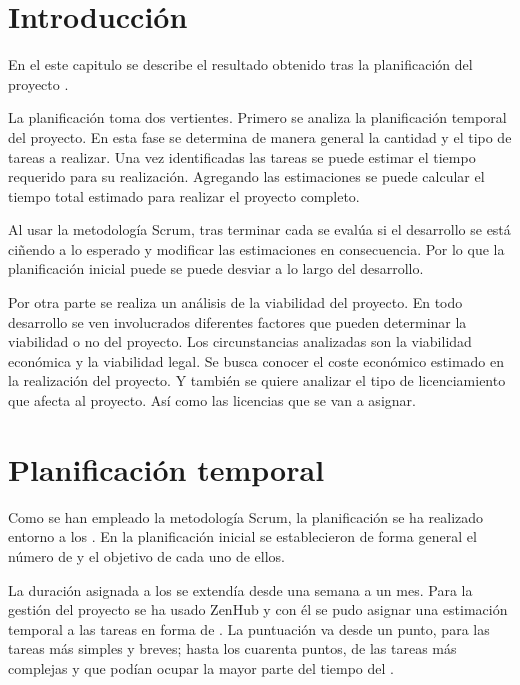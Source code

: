 \label{ch:plan}

\section{Introducción} \label{sec:plan-intro}
En el este capitulo se describe el resultado obtenido tras la planificación del
proyecto .

La planificación toma dos vertientes. Primero se analiza la planificación 
temporal del proyecto. En esta fase se determina de manera general la cantidad
y el tipo de tareas a realizar. Una vez identificadas las tareas se puede
estimar el tiempo requerido para su realización. Agregando las estimaciones se
puede calcular el tiempo total estimado para realizar el proyecto completo.

Al usar la metodología Scrum, tras terminar cada  se
evalúa si el desarrollo se está ciñendo a lo esperado y modificar las
estimaciones en consecuencia. Por lo que la planificación inicial puede
se puede desviar a lo largo del desarrollo.

Por otra parte se realiza un análisis de la viabilidad del proyecto. En todo
desarrollo se ven involucrados diferentes factores que pueden determinar la
viabilidad o no del proyecto. Los circunstancias analizadas son la viabilidad
económica y la viabilidad legal. Se busca conocer el coste económico estimado
en la realización del proyecto. Y también se quiere analizar el tipo de
licenciamiento  que afecta al proyecto. Así como las
licencias que se van a asignar.



\section{Planificación temporal} \label{sec:plan-temporal}

Como se han empleado la metodología Scrum, la planificación se ha realizado
entorno a los . En la planificación inicial se
establecieron de forma general el número de  y el
objetivo de cada uno de ellos.

La duración asignada a los  se extendía desde una semana
a un mes. Para la gestión del proyecto se ha usado ZenHub y con él se pudo
asignar una estimación temporal a las tareas en forma de
. La puntuación va desde un punto, para las
tareas más simples y breves; hasta los cuarenta puntos, de las tareas más
complejas y que podían ocupar la mayor parte del tiempo del
.

